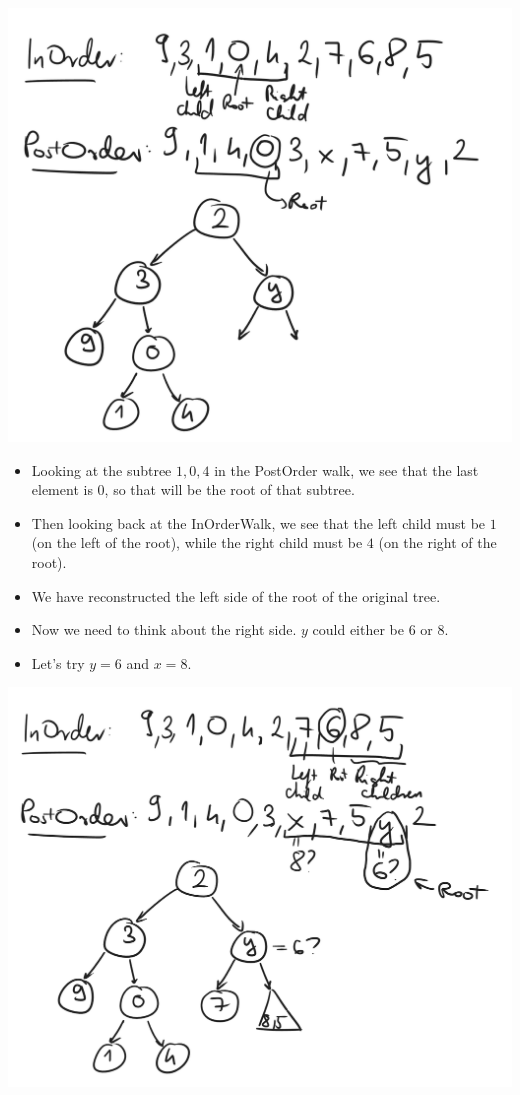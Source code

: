 \begin{center}
    \includegraphics[width=\linewidth]{11/11/reconstruct_05.png}
\end{center}

\begin{itemize}
    \item Looking at the subtree $1,0,4$ in the PostOrder walk, we see that the last element is $0$, so that will be the root of that subtree.
    \item Then looking back at the InOrderWalk, we see that the left child must be $1$ (on the left of the root), while the right child must be $4$ (on the right of the root).
    \item We have reconstructed the left side of the root of the original tree.
    \item Now we need to think about the right side. $y$ could either be $6$ or $8$.
    \item Let's try $y=6$ and $x=8$.
\end{itemize}

\begin{center}
    \includegraphics[width=\linewidth]{11/11/reconstruct_06.png}
\end{center}

